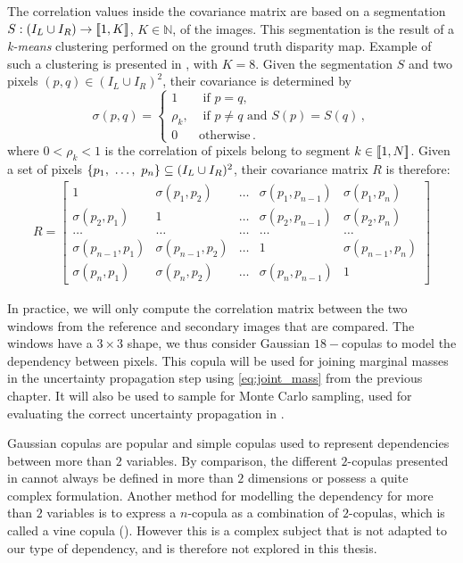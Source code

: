 The correlation values inside the covariance matrix are based on a segmentation $S:(I_L\cup I_R)\rightarrow[\![1,K]\!]$, $K\in\mathbb{N}$, of the images. This segmentation is the result of a \textit{k-means} clustering performed on the ground truth disparity map. Example of such a clustering is presented in , with $K=8$. Given the segmentation $S$ and two pixels $(p, q)\in(I_L\cup I_R)^2$, their covariance is determined by
\begin{equation}\label{eq:correlation}
    \sigma(p, q) =
    \begin{cases}
        1 &\text{ if }p=q,\\
        \rho_k, &\text{ if } p\ne q\text{ and }S(p)=S(q)\,, \\
        0 & \text{otherwise}\,.
    \end{cases}
\end{equation}
where $0<\rho_k<1$ is the correlation of pixels belong to segment $k\in[\![ 1, N]\!]$. Given a set of pixels $\{p_1 , ~\dots, ~ p_n\}\subseteq(I_L\cup I_R)^2$, their covariance matrix $R$ is therefore:
\begin{align}
    R = \begin{bmatrix}
        1 & \sigma(p_{1}, p_{2}) & \dots & \sigma(p_{1}, p_{n-1}) & \sigma(p_{1}, p_{n})\\
        \sigma(p_{2}, p_{1}) & 1 & \dots & \sigma(p_{2}, p_{n-1}) & \sigma(p_{2}, p_{n})\\
        \dots & \dots & \dots & \dots & \dots\\
        \sigma(p_{n-1}, p_{1}) & \sigma(p_{n-1}, p_{2}) & \dots & 1 & \sigma(p_{n-1}, p_{n})\\
        \sigma(p_{n}, p_{1}) & \sigma(p_{n}, p_{2}) & \dots & \sigma(p_{n}, p_{n-1}) & 1
    \end{bmatrix}
\end{align}

In practice, we will only compute the correlation matrix between the two windows from the reference and secondary images that are compared. The windows have a $3\times 3$ shape, we thus consider Gaussian $18-$copulas to model the dependency between pixels. This copula will be used for joining marginal masses in the uncertainty propagation step using \cref{eq:joint_mass} from the previous chapter. It will also be used to sample for Monte Carlo sampling, used for evaluating the correct uncertainty propagation in .

\begin{remark}
    Gaussian copulas are popular and simple copulas used to represent dependencies between more than $2$ variables. By comparison, the different $2$-copulas presented in  cannot always be defined in more than $2$ dimensions or possess a quite complex formulation. Another method for modelling the dependency for more than $2$ variables is to express a $n$-copula as a combination of $2$-copulas, which is called a vine copula (\cite{czado_vine_2022}). However this is a complex subject that is not adapted to our type of dependency, and is therefore not explored in this thesis.
\end{remark}

